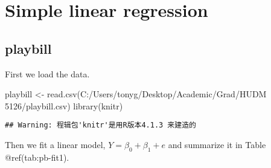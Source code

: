 \documentclass[
]{article}
\author{}
\date{\vspace{-2.5em}}
\newenvironment{Shaded}{\begin{snugshade}}{\end{snugshade}}
\newcommand{\AttributeTok}[1]{\textcolor[rgb]{0.77,0.63,0.00}{#1}}
\newcommand{\ConstantTok}[1]{\textcolor[rgb]{0.00,0.00,0.00}{#1}}
\newcommand{\FunctionTok}[1]{\textcolor[rgb]{0.00,0.00,0.00}{#1}}
\newcommand{\NormalTok}[1]{#1}
\newcommand{\OtherTok}[1]{\textcolor[rgb]{0.56,0.35,0.01}{#1}}
\newcommand{\SpecialCharTok}[1]{\textcolor[rgb]{0.00,0.00,0.00}{#1}}
\newcommand{\StringTok}[1]{\textcolor[rgb]{0.31,0.60,0.02}{#1}}
\begin{document}
\hypertarget{simple-linear-regression}{%
\section{Simple linear regression}\label{simple-linear-regression}}

\hypertarget{playbill}{%
\subsection{playbill}\label{playbill}}

First we load the data.

\begin{Shaded}
\begin{Highlighting}[]
\NormalTok{playbill }\OtherTok{\textless{}{-}} \FunctionTok{read.csv}\NormalTok{(}\StringTok{\textquotesingle{}C:/Users/tonyg/Desktop/Academic/Grad/HUDM 5126/playbill.csv\textquotesingle{}}\NormalTok{)}
\FunctionTok{library}\NormalTok{(knitr)}
\end{Highlighting}
\end{Shaded}

\begin{verbatim}
## Warning: 程辑包'knitr'是用R版本4.1.3 来建造的
\end{verbatim}

Then we fit a linear model, \(Y=\beta_0 + \beta_1 + e\) and summarize it
in Table @ref(tab:pb-fit1).

\begin{Shaded}
\end{Shaded}
\end{document}
